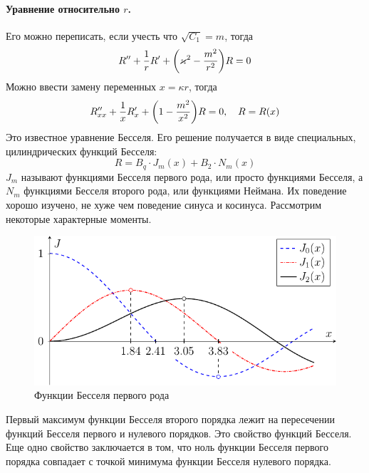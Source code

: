 \paragraph{Уравнение относительно $r$.} Его можно переписать, если учесть что $\sqrt{C_1}=m$, тогда
\begin{equation}
	R''+\frac{1}{r}R'+\qty(\varkappa^2-\frac{m^2}{r^2})R=0
\end{equation}
Можно ввести замену переменных $x=\kappa r$, тогда
\begin{equation}
	R''_{xx}+\frac{1}{x}R'_x+\qty(1-\frac{m^2}{x^2})R=0, \quad R=R(x)
\end{equation}
Это известное уравнение Бесселя. Его решение получается в виде специальных, цилиндрических функций Бесселя:
\begin{equation}
	R=B_q\cdot J_m(x)+B_2\cdot N_m(x)
\end{equation}
$J_m$ называют функциями Бесселя первого рода, или просто функциями Бесселя, а $N_m$ функциями Бесселя второго рода, или функциями Неймана. Их поведение хорошо изучено, не хуже чем поведение синуса и косинуса. Рассмотрим некоторые характерные моменты.
\begin{figure}[ht]
	\centering
	\includegraphics[scale=1.3]{img_lect5/bessel/bessel012}
	\caption{Функции Бесселя первого рода}
	\label{fig:cylinder:besselJ}
\end{figure}
Первый максимум функции Бесселя второго порядка лежит на пересечении функций Бесселя первого и нулевого порядков. Это свойство функций Бесселя. Еще одно свойство заключается в том, что ноль функции Бесселя первого порядка совпадает с точкой минимума функции Бесселя нулевого порядка.
